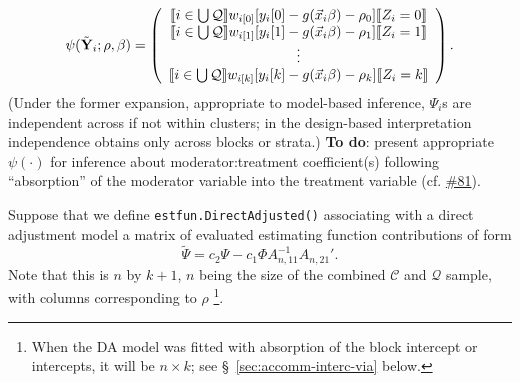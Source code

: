 \documentclass{article}
\DeclarePairedDelimiter{\indicator}{\llbracket}{\rrbracket}
\newcommand{\owt}[1][z_i]{\ensuremath{w_{i[#1]}}}
\begin{document}
\begin{equation*}
           \psi(\tilde{\mathbf{Y}}_{i}; \rho, \beta) =
         \left( \begin{array}{c}
           \indicator{i \in \bigcup \mathcal{Q}}\owt[0][y_{i}[0] - g(\vec{x}_{i}\beta)-
                  \rho_{0}]\indicator{Z_{i}=0}\\
           \indicator{i \in \bigcup \mathcal{Q}}\owt[1][y_{i}[1] - g(\vec{x}_{i}\beta)-
                  \rho_{1}]\indicator{Z_{i}=1}\\
                  \vdots \\
           \indicator{i \in \bigcup \mathcal{Q}}\owt[k][y_{i}[k] - g(\vec{x}_{i}\beta)-
                  \rho_{k}]\indicator{Z_{i}=k}\\                  
                \end{array}\right).
\end{equation*}
(Under the former expansion, appropriate to model-based inference,
${\Psi}_{i}$s are independent across if not within
clusters; in the design-based interpretation independence obtains only across blocks or
strata.)  \textbf{To do}: present appropriate $\psi(\cdot)$ for inference
about moderator:treatment coefficient(s) following ``absorption'' of the moderator
variable into the treatment variable (cf. \href{https://github.com/benbhansen-stats/flexida/issues/81#issuecomment-1282944562}{\#81}).
      
       Suppose that we define \texttt{estfun.DirectAdjusted()} associating
with a direct adjustment model a matrix of evaluated estimating function
contributions of form
\begin{equation*}
  \tilde{\Psi} = c_{2}\Psi - c_{1}\Phi A_{n,11}^{-1}A_{n,21}'.
\end{equation*}
Note that this is $n$ by
$k+1$, $n$ being the size of the combined $\mathcal{C}$ and
$\mathcal{Q}$ sample, with columns corresponding to $\rho$%
\footnote{When the
DA model was fitted with absorption of the block intercept or
intercepts, it will be $n \times k$; see \S~\ref{sec:accomm-interc-via} below.}.
\end{document}

